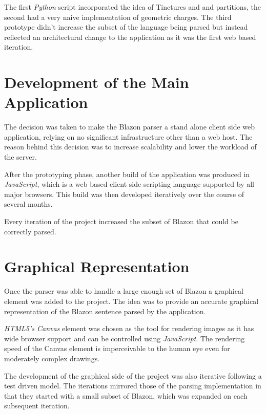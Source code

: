The first \emph{Python} script incorporated the idea of Tinctures and and partitions, the second had a very naive implementation of geometric charges. The third prototype didn't increase the subset of the language being parsed but instead reflected an architectural change to the application as it was the first web based iteration. 



\section{Development of the Main Application}


The decision was taken to make the Blazon parser a stand alone client side web application, relying on no significant infrastructure other than a web host.  The reason behind this decision was to increase scalability and lower the workload of the server.  

After the prototyping phase, another build of the application was produced in \emph{JavaScript}, which is a web based client side scripting language supported by all major browsers.  This build was then developed iteratively over the course of several months.

Every iteration of the project increased the subset of Blazon that could be correctly parsed.



\section{Graphical Representation}

Once the parser was able to handle a large enough set of Blazon a graphical element was added to the project.  The idea was to provide an accurate graphical representation of the Blazon sentence parsed by the application.  

\emph{HTML5's Canvas} element was chosen as the tool for rendering images as it has wide browser support and can be controlled using \emph{JavaScript}.  The rendering speed of the Canvas element is imperceivable to the human eye even for moderately complex drawings.  

The development of the graphical side of the project was also iterative following a test driven model.  The iterations mirrored those of the parsing implementation in that they started with a small subset of Blazon, which was expanded on each subsequent iteration. 

